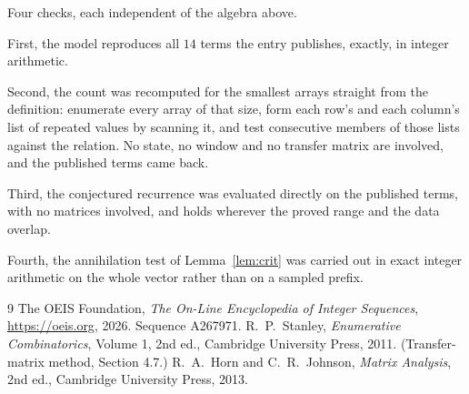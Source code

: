 \documentclass[11pt,a4paper]{article}
\theoremstyle{plain}
\theoremstyle{definition}
\begin{document}
Four checks, each independent of the algebra above.

First, the model reproduces all $14$ terms the entry publishes, exactly, in integer
arithmetic.

Second, the count was recomputed for the smallest arrays straight from the definition:
enumerate every array of that size, form each row's and each column's list of repeated values
by scanning it, and test consecutive members of those lists against the relation. No state, no
window and no transfer matrix are involved, and the published terms came back.

Third, the conjectured recurrence was evaluated directly on the published terms, with no
matrices involved, and holds wherever the proved range and the data overlap.

Fourth, the annihilation test of Lemma~\ref{lem:crit} was carried out in exact integer
arithmetic on the whole vector rather than on a sampled prefix.

\begin{thebibliography}{9}
 The OEIS Foundation, \emph{The On-Line Encyclopedia of Integer
Sequences}, \url{https://oeis.org}, 2026. Sequence A267971.
 R.~P.~Stanley, \emph{Enumerative Combinatorics}, Volume 1, 2nd ed.,
Cambridge University Press, 2011. (Transfer-matrix method, Section 4.7.)
 R.~A.~Horn and C.~R.~Johnson, \emph{Matrix Analysis}, 2nd ed., Cambridge
University Press, 2013.
\end{thebibliography}
\end{document}
